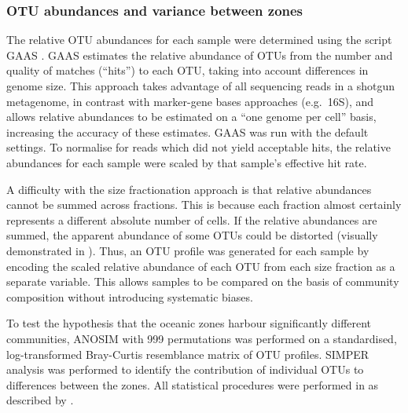 \subsubsection{OTU abundances and variance between zones}

The relative \ac{OTU} abundances for each sample were determined using the  script \ac{GAAS} \cite{Angly:2009ip}.
\ac{GAAS} estimates the relative abundance of \acp{OTU} from the number and quality of  matches (``hits'') to each \ac{OTU}, taking into account differences in genome size. 
This approach takes advantage of all sequencing reads in a shotgun metagenome, in contrast with marker-gene bases approaches (e.g.\ 16S), and allows relative abundances to be estimated on a ``one genome per cell'' basis, increasing the accuracy of these estimates.
\ac{GAAS} was run with the default settings. 
To normalise for reads which did not yield acceptable hits, the relative abundances for each sample were scaled by that sample's effective  hit rate.

A difficulty with the size fractionation approach is that relative abundances cannot be summed across fractions.
This is because each fraction almost certainly represents a different absolute number of cells.
If the relative abundances are summed, the apparent abundance of some \acp{OTU} could be distorted (visually demonstrated in ).
Thus, an \ac{OTU} profile was generated for each sample by encoding the scaled relative abundance of each \ac{OTU} from each size fraction as a separate variable.
This allows samples to be compared on the basis of community composition without introducing systematic biases.



To test the hypothesis that the oceanic zones harbour significantly different communities, \ac{ANOSIM} with 999 permutations was performed on a standardised, log-transformed Bray-Curtis resemblance matrix of \ac{OTU} profiles.
\ac{SIMPER} analysis was performed to identify the contribution of individual \acp{OTU} to differences between the zones. 
All statistical procedures were performed in  as described by \citet{Clarke:2001ut}.

